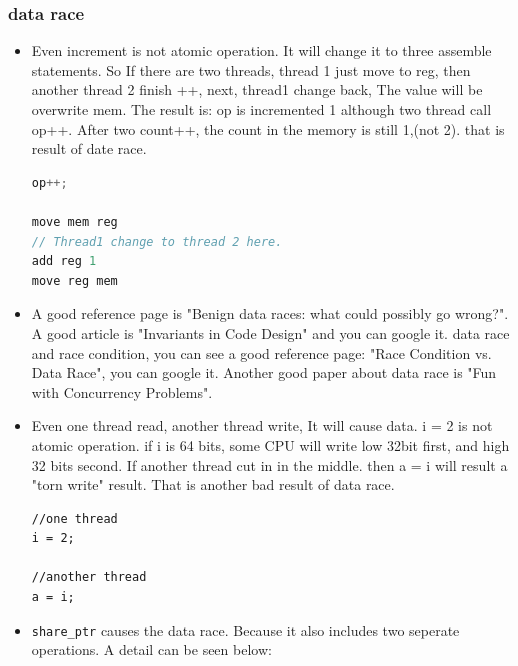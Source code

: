 \documentclass[a4paper,11pt,twoside]{book}
\begin{document}
\subsubsection{data race}
\begin{itemize}

	\item Even increment is not atomic operation. It will change it to three assemble statements. So If there are two threads, thread 1 just move to reg, then another thread 2 finish ++, next, thread1 change back, The value will be overwrite mem. The result is: op is incremented 1 although two thread call op++.  After two count++, the count in the memory is still 1,(not 2). that is result of date race.
\begin{lstlisting}[frame=single, language=c++]
op++;

move mem reg
// Thread1 change to thread 2 here. 
add reg 1
move reg mem
\end{lstlisting}		
	\item  A good reference page is "Benign data races: what could possibly go wrong?".   A good article is "Invariants in Code Design" and you can google it. data race and race condition, you can see a good reference page: "Race Condition vs. Data Race", you can google it.  Another good paper about data race is "Fun with Concurrency Problems".

    \item Even one thread read, another thread write, It will cause data.  i = 2 is not atomic operation. if i is 64 bits, some CPU will write low 32bit first, and high 32 bits second. If another thread cut in in the middle. then a = i will result a "torn write" result. That is another bad result of data race.
\begin{lstlisting}[]
//one thread 
i = 2;

//another thread
a = i;
\end{lstlisting}

    \item \texttt{share\_ptr} causes the data race. Because it also includes two seperate operations. A detail can be seen below:


\end{itemize}
\end{document}
